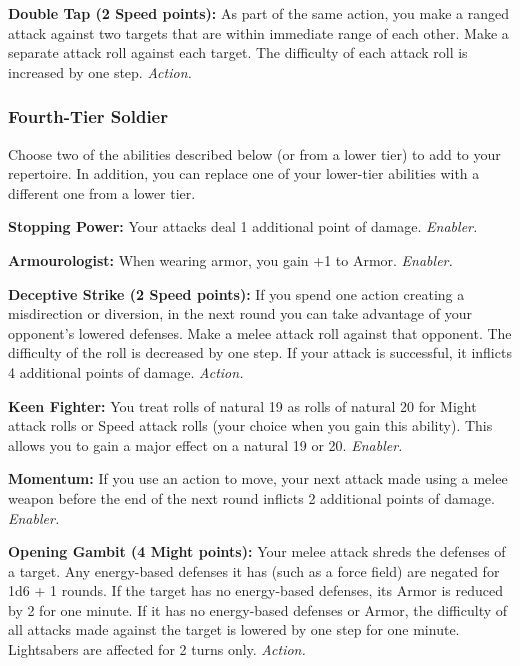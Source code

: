 \documentclass[a4paper,10pt,final,twocolumn,oneside]{book}
\newcommand{\itemAbility}[2]{\textcolor{25gray}{\textbullet\textbf{ #1:}}{ #2}\par}
\newcommand{\enabler}{\textit{ Enabler.}}
\newcommand{\action}{\textit{ Action.}}
\begin{document}
\itemAbility{Double Tap (2 Speed points)}{As part of the same action, you make a ranged attack against two targets that are within immediate range of each other. Make a separate attack roll against each target. The difficulty of each attack roll is increased by one step.\action}


\subsubsection*{Fourth-Tier Soldier}
\label{subsub:soldierFourthTier}

Choose two of the abilities described below (or from a lower tier) to add to your repertoire. In addition, you can replace one of your lower-tier abilities with a different one from a lower tier.

\itemAbility{Stopping Power}{Your attacks deal 1 additional point of damage.\enabler}

\itemAbility{Armourologist}{When wearing armor, you gain +1 to Armor.\enabler}

\itemAbility{Deceptive Strike (2 Speed points)}{If you spend one action creating a misdirection or diversion, in the next round you can take advantage of your opponent’s lowered defenses. Make a melee attack roll against that opponent. The difficulty of the roll is decreased by one step. If your attack is successful, it inflicts 4 additional points of damage.\action}

\itemAbility{Keen Fighter}{You treat rolls of natural 19 as rolls of natural 20 for Might attack rolls or Speed attack rolls (your choice when you gain this ability). This allows you to gain a major effect on a natural 19 or 20.\enabler}

\itemAbility{Momentum}{If you use an action to move, your next attack made using a melee weapon before the end of the next round inflicts 2 additional points of damage.\enabler}

\itemAbility{Opening Gambit (4 Might points)}{Your melee attack shreds the defenses of a target. Any energy-based defenses it has (such as a force field) are negated for 1d6 + 1 rounds. If the target has no energy-based defenses, its Armor is reduced by 2 for one minute. If it has no energy-based defenses or Armor, the difficulty of all attacks made against the target is lowered by one step for one minute. Lightsabers are affected for 2 turns only.\action}
\end{document}
